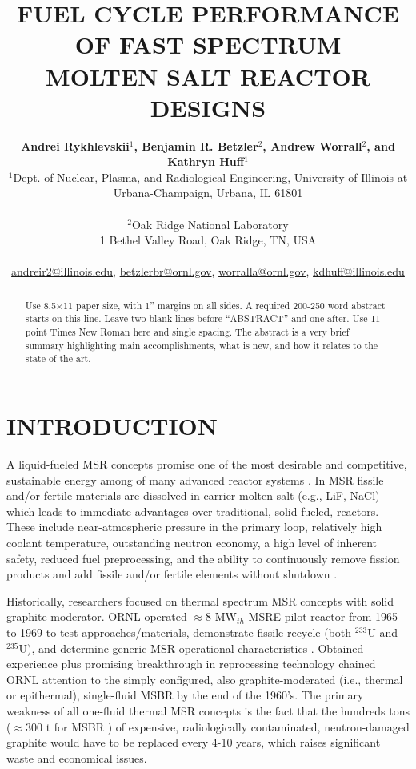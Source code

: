 \documentclass[letterpaper]{mandc2019}
\title{FUEL CYCLE PERFORMANCE OF FAST SPECTRUM \\
  MOLTEN SALT REACTOR DESIGNS}
\author{%
  \textbf{Andrei Rykhlevskii$^1$, Benjamin R. Betzler$^2$, Andrew Worrall$^2$, and Kathryn Huff$^1$} \\
  $^1$Dept. of Nuclear, Plasma, and Radiological Engineering, University of Illinois at \\
  Urbana-Champaign, Urbana, IL 61801 \\ 
\\
  $^2$Oak Ridge National Laboratory \\
1 Bethel Valley Road, Oak Ridge, TN, USA  \\ 
\\
  \url{andreir2@illinois.edu}, \url{betzlerbr@ornl.gov}, \url{worralla@ornl.gov}, \url{kdhuff@illinois.edu}
}
\begin{document}
\maketitle
\justify 

\begin{abstract}
  Use 8.5$\times$11 paper size, with 1'' margins on all sides.  A required 200-250 
  word abstract starts on this line.  Leave two blank lines before ``ABSTRACT''
  and one after.  Use 11 point Times New Roman here and single 
  spacing. The abstract is a very brief summary highlighting main 
  accomplishments, what is new, and how it relates to the state-of-the-art.
\end{abstract}

\section{INTRODUCTION} 
\label{sec:intro}
A liquid-fueled \gls{MSR} concepts promise one of the most desirable and competitive, sustainable energy among of many advanced reactor systems \cite{siemer_why_2015}. In \gls{MSR} fissile and/or fertile materials are dissolved in carrier molten salt (e.g., LiF, NaCl) which leads to immediate advantages over traditional, solid-fueled, reactors. These include near-atmospheric pressure in the primary loop, relatively high coolant temperature, outstanding neutron economy, a high level of inherent safety,
reduced fuel preprocessing, and the ability to continuously remove fission products and add fissile and/or fertile elements without shutdown \cite{leblanc_molten_2010}. 

Historically, researchers focused on thermal spectrum \gls{MSR} concepts with solid graphite moderator.  \gls{ORNL} operated $\approx$8 MW$_{th}$ \gls{MSRE} pilot reactor from 1965 to 1969 to test approaches/materials, demonstrate fissile recycle (both $^{233}$U and $^{235}$U), and determine generic \gls{MSR} operational characteristics \cite{macpherson_molten_1985}. Obtained experience plus promising breakthrough in reprocessing technology \cite{whatley_engineering_1970} chained \gls{ORNL} attention to the simply configured, also graphite-moderated (i.e., thermal or epithermal), single-fluid \gls{MSBR} by the end of the 1960’s. The primary weakness of all one-fluid thermal \gls{MSR} concepts is the fact that the hundreds tons ($\approx$300 t for \gls{MSBR} \cite{robertson_conceptual_1971}) of expensive, radiologically contaminated, neutron-damaged graphite would have to be replaced every 4-10 years, which raises significant waste and economical issues.
\end{document}
